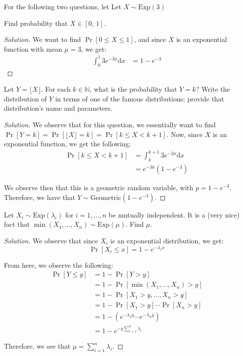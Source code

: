 \documentclass{article}
\newenvironment{solution}{\begin{proof}[Solution]}{\end{proof}}
\newcommand{\NN}{\mathbb{N}}
\begin{document}
For the following two questions, let Let $X \sim \mathrm{Exp}(3)$
\begin{hw}
	Find probability that $X \in [0, \,1]$.
\end{hw}
\begin{solution}
	We want to find $\Pr[0 \leq X \leq 1]$, and since $X$ is an exponential function with mean $\mu = 3$, we get:
	\begin{align*}
		\int_{0}^{1} 3e^{-3x} \mathrm{d}x &= 1 - e^{-3}
	\end{align*}
\end{solution}
\begin{hw}
	Let $Y = \lfloor X \rfloor$. For each $k \in \NN$, what is the probability that $Y = k$? Write the distribution of $Y$ in terms of one of the famous distributions; provide that distribution's name and parameters.
\end{hw}
\begin{solution}
	We observe that for this question, we essentially want to find $\Pr[Y = k] = \Pr[\lfloor X \rfloor = k] = \Pr[k \leq X < k+1]$. Now, since $X$ is an exponential function, we get the following:
	\begin{align*}
		\Pr[k \leq X < k+1] &= \int_{k}^{k+1} 3e^{-3x} \mathrm{d}x \\
		&= e^{-3k}(1-e^{-3})
	\end{align*}

	We observe then that this is a geometric random variable, with $p = 1-e^{-3}$. Therefore, we have that $Y \sim \mathrm{Geometric}(1-e^{-3})$.
\end{solution}

\begin{hw}
	Let $X_i \sim \mathrm{Exp}(\lambda_i)$ for $i = 1,\ldots,n$ be mutually independent. It is a (very nice) fact that $\min(X_1,\ldots,X_n) \sim \mathrm{Exp}(\mu)$. Find $\mu$.
\end{hw}
\begin{solution}
	We observe that since $X_{i}$ is an exponential distribution, we get:
	\begin{equation*}
		\Pr[X_{i} \leq x] = 1 - e^{-\lambda_{i} x}
	\end{equation*}

	From here, we observe the following:
	\begin{align*}
		\Pr[Y \leq y] &= 1 - \Pr[Y > y] \\
		&= 1 - \Pr[\min(X_{1}, \ldots, X_{n}) > y] \\
		&= 1 - \Pr[X_{1} > y, \ldots, X_{n} > y] \\
		&= 1 - \Pr[X_{1} > y]\cdots\Pr[X_{n} > y] \\
		&= 1 - \left( e^{-\lambda_{1}y} \cdots e^{-\lambda_{n}y} \right) \\
		&= 1 - e^{-y\sum_{i = 1}^{n} \lambda_{i}}
	\end{align*}

	Therefore, we see that $\mu = \sum_{i=1}^{n} \lambda_i$.
\end{solution}
\end{document}
